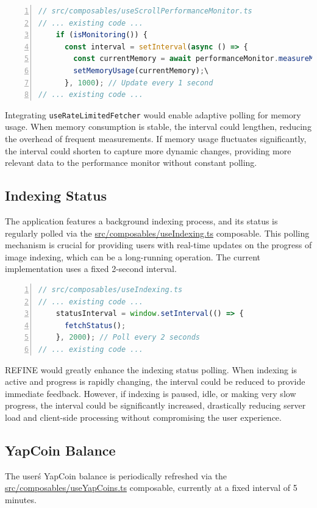 \documentclass[10pt]{article}
\begin{document}
\begin{lstlisting}[language=TypeScript, basicstyle=\small\ttfamily, numbers=left, xleftmargin=1em, xrightmargin=1em, breaklines=true]
// src/composables/useScrollPerformanceMonitor.ts
// ... existing code ...
    if (isMonitoring()) {
      const interval = setInterval(async () => {
        const currentMemory = await performanceMonitor.measureMemoryUsage();
        setMemoryUsage(currentMemory);\
      }, 1000); // Update every 1 second
// ... existing code ...
\end{lstlisting}

Integrating \texttt{useRateLimitedFetcher} would enable adaptive polling for memory usage. When memory consumption is stable, the interval could lengthen, reducing the overhead of frequent measurements. If memory usage fluctuates significantly, the interval could shorten to capture more dynamic changes, providing more relevant data to the performance monitor without constant polling.

\subsection{Indexing Status}
The application features a background indexing process, and its status is regularly polled via the \url{src/composables/useIndexing.ts} composable. This polling mechanism is crucial for providing users with real-time updates on the progress of image indexing, which can be a long-running operation. The current implementation uses a fixed 2-second interval.

\begin{lstlisting}[language=TypeScript, basicstyle=\small\ttfamily, numbers=left, xleftmargin=1em, xrightmargin=1em, breaklines=true]
// src/composables/useIndexing.ts
// ... existing code ...
    statusInterval = window.setInterval(() => {
      fetchStatus();
    }, 2000); // Poll every 2 seconds
// ... existing code ...
\end{lstlisting}

REFINE would greatly enhance the indexing status polling. When indexing is active and progress is rapidly changing, the interval could be reduced to provide immediate feedback. However, if indexing is paused, idle, or making very slow progress, the interval could be significantly increased, drastically reducing server load and client-side processing without compromising the user experience.

\subsection{YapCoin Balance}
The user\'s YapCoin balance is periodically refreshed via the \url{src/composables/useYapCoins.ts} composable, currently at a fixed interval of 5 minutes.
\end{document}
